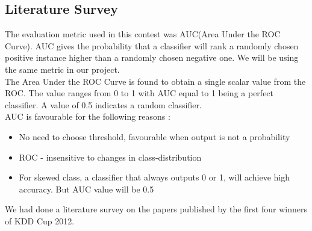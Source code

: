 \documentclass[10pt]{article}
\begin{document}
\subsection{Literature Survey}
The evaluation metric used in this contest was AUC(Area Under the ROC Curve). AUC gives the probability that a classifier will rank a randomly chosen positive instance higher than a randomly chosen negative one. We will be using the same metric in our project.\\
The Area Under the ROC Curve is found to obtain a single scalar value from the ROC. The value ranges from 0 to 1 with AUC equal to 1 being a perfect classifier. A value of 0.5 indicates a random classifier.\\
AUC is favourable for the following reasons :
\begin{itemize}
	\item No need to choose threshold, favourable when output is not a probability
	\item ROC - insensitive to changes in class-distribution
	\item For skewed class, a classifier that always outputs 0 or 1, will achieve high accuracy. But AUC value will be 0.5 
\end{itemize}
We had done a literature survey on the papers published by the first four winners of KDD Cup 2012.\\
\end{document}
